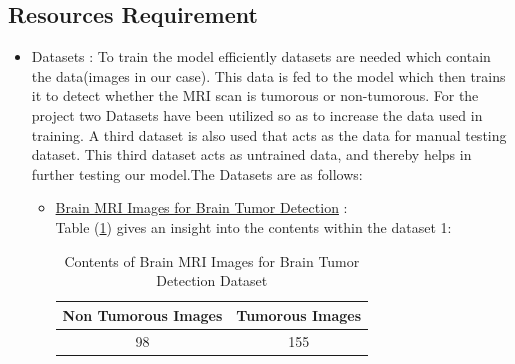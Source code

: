 \subsection{Resources Requirement}
\begin{itemize}
    \item Datasets : To train the model efficiently datasets are needed which contain the data(images in our case). This data is fed to the model which then trains it to detect whether the MRI scan is tumorous or non-tumorous. For the project two Datasets have been utilized so as to increase the data used in training. A third dataset is also used that acts as the data for manual testing dataset. This third dataset acts as untrained data, and thereby helps in further testing our model.The Datasets are as follows:
        \begin{itemize}
            \item \href{https://www.kaggle.com/navoneel/brain-mri-images-for-brain-tumor-detection}{Brain MRI Images for Brain Tumor Detection} : \\
                Table (\ref{tab:Dataset1}) gives an insight into the contents within the dataset 1:

                \begin{table}[h!]
                \caption{Contents of Brain MRI Images for Brain Tumor Detection Dataset}
                \label{tab:Dataset1}
                \begin{tabular}{|c|c|}
                \hline
                \rowcolor[HTML]{CBCEFB} 
                \textbf{Non Tumorous Images} & \textbf{Tumorous Images} \\ \hline
                98                           & 155                      \\ \hline
                \end{tabular}
                \end{table}
                

\end{itemize}
\end{itemize}
